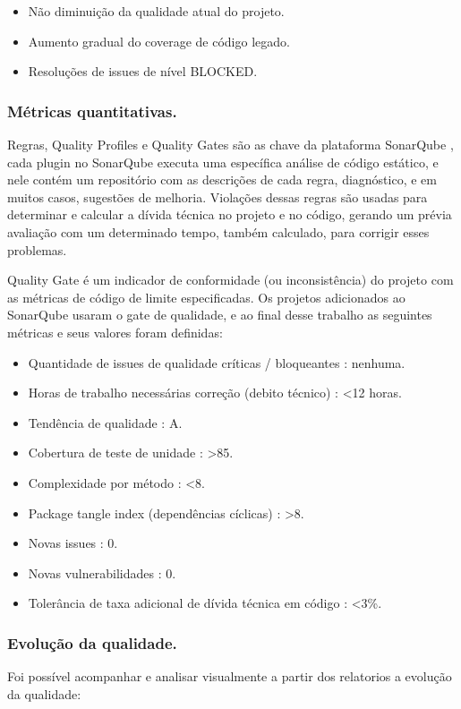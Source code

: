\documentclass[12pt]{article}
\begin{document}
 \begin{itemize}
 	\item Não diminuição da qualidade atual do projeto.
 	\item Aumento gradual do coverage de código legado.
 	\item Resoluções de issues de nível BLOCKED.
 \end{itemize}

\subsubsection{Métricas quantitativas.} \label{sec:sonar-planning-mquantity}

Regras, Quality Profiles e Quality Gates são as chave da plataforma SonarQube \cite{SONARQUBE}, cada plugin no SonarQube executa uma específica análise de código estático, e nele contém um repositório com as descrições de cada regra, diagnóstico, e em muitos casos, sugestões de melhoria.
Violações dessas regras são usadas para determinar e calcular a dívida técnica no projeto e no código, gerando um prévia avaliação com um determinado tempo, também calculado, para corrigir esses problemas.

Quality Gate é um indicador de conformidade (ou inconsistência) do projeto com as métricas de código de limite especificadas\cite{SONARQUBE}. Os projetos adicionados ao SonarQube usaram o gate de qualidade, e ao final desse trabalho as seguintes métricas e seus valores foram definidas:

 \begin{itemize}
 	\item Quantidade de issues de qualidade críticas / bloqueantes : nenhuma.
 	\item Horas de trabalho necessárias correção (debito técnico) : \textless 12 horas.
 	\item Tendência de qualidade : A.
 	\item Cobertura de teste de unidade : \textgreater 85.
 	\item Complexidade por método : \textless 8.
 	\item Package tangle index (dependências cíclicas) : \textgreater 8.
	\item Novas issues : 0.
	\item Novas vulnerabilidades : 0.
	\item Tolerância de taxa adicional de dívida técnica em código : \textless 3\%.
 \end{itemize}

\subsubsection{Evolução da qualidade.} \label{sec:evolucao-mquantity}
Foi possível acompanhar e analisar visualmente a partir dos relatorios a evolução da qualidade:
\end{document}
